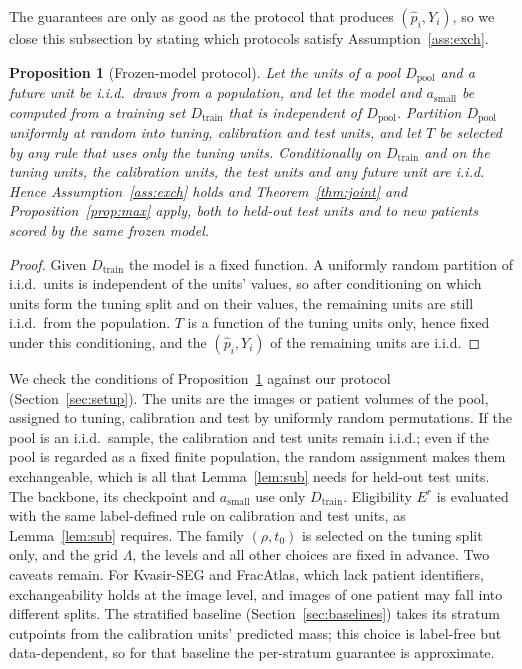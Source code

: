\documentclass[sn-mathphys-num]{sn-jnl}%
\theoremstyle{thmstyleone}
\newtheorem{proposition}{Proposition}
\theoremstyle{thmstyletwo}
\theoremstyle{thmstylethree}
\newcommand{\1}{\mathbb{1}}
\begin{document}
The guarantees are only as good as the protocol that produces $(\hat p_i,Y_i)$, so we close this subsection by stating which protocols satisfy Assumption~\ref{ass:exch}.

\begin{proposition}[Frozen-model protocol]\label{prop:frozen}
Let the units of a pool $D_{\mathrm{pool}}$ and a future unit be i.i.d.\ draws from a population, and let the model and $a_{\mathrm{small}}$ be computed from a training set $D_{\mathrm{train}}$ that is independent of $D_{\mathrm{pool}}$. Partition $D_{\mathrm{pool}}$ uniformly at random into tuning, calibration and test units, and let $T$ be selected by any rule that uses only the tuning units. Conditionally on $D_{\mathrm{train}}$ and on the tuning units, the calibration units, the test units and any future unit are i.i.d. Hence Assumption~\ref{ass:exch} holds and Theorem~\ref{thm:joint} and Proposition~\ref{prop:max} apply, both to held-out test units and to new patients scored by the same frozen model.
\end{proposition}
\begin{proof}
Given $D_{\mathrm{train}}$ the model is a fixed function. A uniformly random partition of i.i.d.\ units is independent of the units' values, so after conditioning on which units form the tuning split and on their values, the remaining units are still i.i.d.\ from the population. $T$ is a function of the tuning units only, hence fixed under this conditioning, and the $(\hat p_i,Y_i)$ of the remaining units are i.i.d.
\end{proof}

We check the conditions of Proposition~\ref{prop:frozen} against our protocol (Section~\ref{sec:setup}). The units are the images or patient volumes of the pool, assigned to tuning, calibration and test by uniformly random permutations. If the pool is an i.i.d.\ sample, the calibration and test units remain i.i.d.; even if the pool is regarded as a fixed finite population, the random assignment makes them exchangeable, which is all that Lemma~\ref{lem:sub} needs for held-out test units. The backbone, its checkpoint and $a_{\mathrm{small}}$ use only $D_{\mathrm{train}}$. Eligibility $E^r$ is evaluated with the same label-defined rule on calibration and test units, as Lemma~\ref{lem:sub} requires. The family $(\rho,t_0)$ is selected on the tuning split only, and the grid $\Lambda$, the levels and all other choices are fixed in advance. Two caveats remain. For Kvasir-SEG and FracAtlas, which lack patient identifiers, exchangeability holds at the image level, and images of one patient may fall into different splits. The stratified baseline (Section~\ref{sec:baselines}) takes its stratum cutpoints from the calibration units' predicted mass; this choice is label-free but data-dependent, so for that baseline the per-stratum guarantee is approximate.
\end{document}
